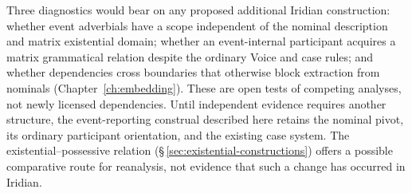 Three diagnostics would bear on any proposed additional Iridian construction:
whether event adverbials have a scope independent of the nominal description
and matrix existential domain; whether an event-internal participant acquires
a matrix grammatical relation despite the ordinary Voice and case rules; and
whether dependencies cross boundaries that otherwise block extraction from
nominals (Chapter~\ref{ch:embedding}). These are open tests of competing
analyses, not newly licensed dependencies. Until independent evidence requires
another structure, the event-reporting construal described here retains the
nominal pivot, its ordinary participant orientation, and the existing case
system. The existential--possessive relation
(\S\,\ref{sec:existential-constructions}) offers a possible comparative route
for reanalysis, not evidence that such a change has occurred in Iridian.
